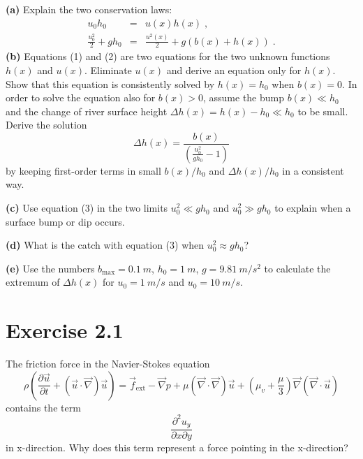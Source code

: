\documentclass[a4paper, 10pt]{article}
\newcommand{\pdiff}[2]{\frac{\partial #1}{\partial #2}} %
\begin{document}
{\bf (a)} Explain the two conservation laws: 
\begin{eqnarray}
	u_0 h_0 &=& u(x) h(x) \; , \\
	\frac{u_0^2}{2} + g h_0 &=& \frac{u^2(x)}{2} + g \left( b(x) + h(x) \right) \; .
\end{eqnarray}
{\bf (b)} Equations (1) and (2) are two equations for the two unknown functions $h(x)$ and $u(x)$. Eliminate $u(x)$ and derive an equation only for $h(x)$. Show that this equation is consistently solved by $h(x)=h_0$ when $b(x)=0$. In order to solve the equation also for $b(x)>0$, assume the bump $b(x)\ll h_0$ and the change of river surface height $\Delta h(x) = h(x)-h_0\ll h_0$ to be small. Derive the solution
\begin{equation}
	\Delta h(x) = \frac{b(x)}{\left(\frac{u_0^2}{gh_0}-1\right)}
\end{equation}
by keeping first-order terms in small $b(x)/h_0$ and $\Delta h(x)/h_0$ in a consistent way. \newline

{\bf (c)} Use equation (3) in the two limits $u_0^2\ll gh_0$ and $u_ 0^2 \gg g h_0$ to explain when a surface bump or dip occurs. \newline

{\bf (d)} What is the catch with equation (3) when $u_0^2\approx gh_0$? \newline

{\bf (e)} Use the numbers $b_\mathrm{max}=\SI{0.1}{m}$, $h_0=\SI{1}{m}$, $g=\SI{9.81}{m/s^2}$ to calculate the extremum of $\Delta h(x)$ for $u_0=\SI{1}{m/s}$ and $u_0=\SI{10}{m/s}$.
\newpage


\section*{Exercise 2.1}
The friction force in the Navier-Stokes equation
\begin{equation}
    \rho \left(\pdiff{\vec{u}}{t} + \left(\vec{u}\cdot\vec{\nabla}\right)\vec{u}\right) =
    \vec{f}_{\mathrm{ext}} - \vec{\nabla}p + \mu \left(\vec{\nabla}\cdot\vec{\nabla}\right)\vec{u} +
    \left(\mu_v + \frac{\mu}{3}\right)\vec{\nabla}\left(\vec{\nabla}\cdot\vec{u}\right)
\end{equation}
contains the term
\begin{equation}
    \pdiff{^2u_y}{x\partial y}
\end{equation}
in x-direction. Why does this term represent a force pointing in the x-direction?
\end{document}

